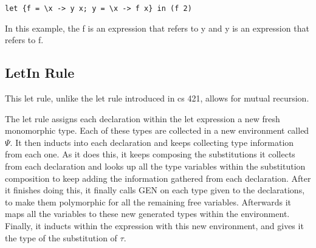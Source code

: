 \begin{lstlisting}
let {f = \x -> y x; y = \x -> f x} in (f 2)
\end{lstlisting}

In this example, the f is an expression that refers to y and y is an expression that refers to f.

\subsection{LetIn Rule}
This let rule, unlike the let rule introduced in cs 421, allows for mutual recursion.

The let rule assigns each declaration within the let expression a new fresh monomorphic type. Each of these types are collected in a new environment called \texttt{$\Psi$}. It then inducts into each declaration and keeps collecting type information from each one. As it does this, it keeps composing the substitutions it collects from each declaration and looks up all the type variables within the substitution composition to keep adding the information gathered from each declaration. After it finishes doing this, it finally calls GEN on each type given to the declarations, to make them polymorphic for all the remaining free variables. Afterwards it maps all the variables to these new generated types within the environment. Finally, it inducts within the expression with this new environment, and gives it the type of the substitution of \texttt{$\tau$}.

\begin{prooftree}
\end{prooftree}

\begin{prooftree}
\end{prooftree}

